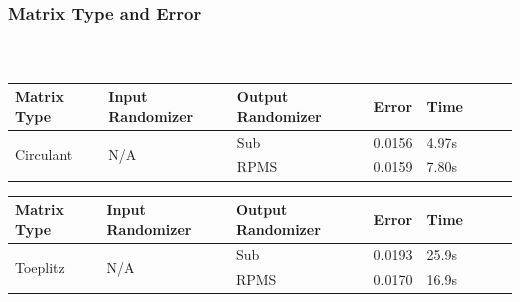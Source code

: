 \begin{frame}[t]
\frametitle{Matrix Type and Error}
\framesubtitle{~~}  %




\begin{table}[h]
\begin{tabular}{lll|lllll}
	\textbf{Matrix Type}       & \textbf{Input Randomizer} & \textbf{Output Randomizer} & \textbf{Error} & \textbf{Time} & \\ \hline
	\multirow{2}{*}{Circulant} & \multirow{2}{*}{N/A}      & Sub                   & 0.0156         & 4.97s         & \\
	                           &                           & RPMS                  & 0.0159         & 7.80s         & \\
\end{tabular}
\end{table}

\begin{table}[h]
\begin{tabular}{lll|lllll}
	\textbf{Matrix Type}      & \textbf{Input Randomizer} & \textbf{Output Randomizer} & \textbf{Error} & \textbf{Time} & \\ \hline
	\multirow{2}{*}{Toeplitz} & \multirow{2}{*}{N/A}      & Sub                   & 0.0193         & 25.9s         & \\
	                          &                           & RPMS                  & 0.0170         & 16.9s         & \\
\end{tabular}
\end{table}

\end{frame}



